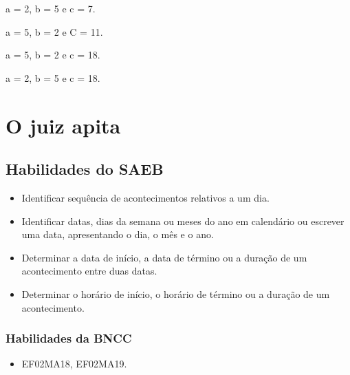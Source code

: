 \begin{escolha}[itemsep=-5pt]
\item a = 2, b = 5 e c = 7.

\item a = 5, b = 2 e C = 11.

\item a = 5, b = 2 e c = 18.

\item a = 2, b = 5 e c = 18.
\end{escolha}

\chapter{O juiz apita}

\vspace*{-1cm}

\section*{Habilidades do SAEB}

\begin{itemize}
\item Identificar sequência de acontecimentos relativos a um dia.

\item Identificar datas, dias da semana ou meses do ano em calendário ou
escrever uma data, apresentando o dia, o mês e o ano.

\item Determinar a data de início, a data de término ou a duração de um
acontecimento entre duas datas.

\item Determinar o horário de início, o horário de término ou a duração de
um acontecimento.
\end{itemize}

\subsection{Habilidades da BNCC}

\begin{itemize}
\item EF02MA18, EF02MA19.
\end{itemize}


